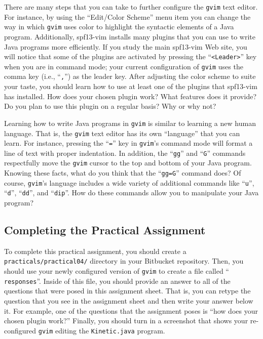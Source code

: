 There are many steps that you can take to further configure the {\tt gvim} text editor.  For instance, by using the
``Edit/Color Scheme'' menu item you can change the way in which {\tt gvim} uses color to highlight the syntactic
elements of a Java program. Additionally, spf13-vim installs many plugins that you can use to write Java programs more
efficiently.  If you study the main spf13-vim Web site, you will notice that some of the plugins are activated by
pressing the ``{\tt <Leader>}'' key when you are in command mode; your current configuration of {\tt gvim} uses the
comma key (i.e., ``{\tt ,}'') as the leader key. After adjusting the color scheme to suite your taste, you should learn
how to use at least one of the plugins that spf13-vim has installed.  How does your chosen plugin work?  What features
does it provide? Do you plan to use this plugin on a regular basis? Why or why not? 

Learning how to write Java programs in {\tt gvim} is similar to learning a new human language.  That is, the {\tt gvim}
text editor has its own ``language'' that you can learn.  For instance, pressing the ``{\tt =}'' key in {\tt gvim}'s
command mode will format a line of text with proper indentation.  In addition, the ``{\tt gg}'' and ``{\tt G}'' commands
respectfully move the {\tt gvim} cursor to the top and bottom of your Java program.  Knowing these facts, what do you
think that the ``{\tt gg=G}'' command does? Of course, {\tt gvim}'s language includes a wide variety of additional
commands like ``{\tt u}'', ``{\tt d}'', ``{\tt dd}'', and ``{\tt dip}''.  How do these commands allow you to manipulate
your Java program?

\vspace*{-.15in}
\subsection*{Completing the Practical Assignment}
\vspace*{-.15in}

To complete this practical assignment, you should create a {\tt practicals/practical04/} directory in your Bitbucket
repository. Then, you should use your newly configured version of {\tt gvim} to create a file called ``{\tt
  responses}''. Inside of this file, you should provide an answer to all of the questions that were posed in this
assignment sheet. That is, you can retype the question that you see in the assignment sheet and then write your answer
below it. For example, one of the questions that the assignment poses is ``how does your chosen plugin work?'' Finally,
you should turn in a screenshot that shows your re-configured {\tt gvim} editing the {\tt Kinetic.java} program.

